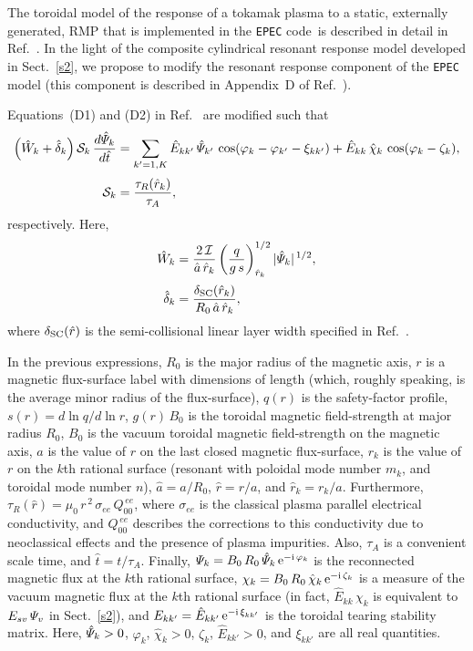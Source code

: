 \documentclass[12pt,prb,aps]{revtex4-1}
\begin{document}
The toroidal model of the response of a tokamak plasma to a static, externally generated, RMP that is implemented in the {\tt EPEC} code\,\cite{rftor1} is described in
detail in Ref.~. In the light of the composite cylindrical resonant response model developed in Sect.~\ref{s2}, we propose to 
modify the resonant  response component of the {\tt EPEC} model (this component is described in Appendix~D of Ref.~).

Equations~(D1) and (D2) in Ref.~ are modified such that 
\begin{align}\label{e15}
\left(\hat{W}_k + \hat{\delta}_k\right){\cal S}_k\,\frac{d\hat{\mit\Psi}_k}{d\hat{t}} &= \sum_{k'=1,K}\hat{E}_{kk'}\,\hat{\mit\Psi}_{k'}\,\cos(\varphi_k-\varphi_{k'}-\xi_{kk'})
+\hat{E}_{kk}\,\hat{\chi}_k\,\cos(\varphi_k-\zeta_k),\\[0.5ex]
{\cal S}_k&=\frac{\tau_R(\hat{r}_k)}{\tau_A},
\end{align}
respectively. Here, 
\begin{align}
\hat{W}_k &=\frac{2\,{\cal I}}{\hat{a}\,\hat{r}_k}\left(\frac{q}{g\,s}\right)_{\hat{r}_k}^{1/2} |\hat{\mit\Psi}_k|^{\,1/2},\\[0.5ex]
\hat{\delta}_k &= \frac{\delta_{\rm SC}(\hat{r}_k)}{R_0\,\hat{a}\,\hat{r}_k},
\end{align}
where $\delta_{\rm SC}(\hat{r})$ is the semi-collisional linear layer width specified in Ref.~.

In the previous expressions, $R_0$ is the major radius of the magnetic axis, $r$ is a magnetic flux-surface label with dimensions of length (which, roughly speaking, is the average minor radius of the
flux-surface), $q(r)$ is the safety-factor profile, $s(r)=d\ln q/d\ln r$, 
$g(r)\,B_0$ is the toroidal magnetic field-strength at major radius $R_0$, $B_0$ is the vacuum
toroidal magnetic field-strength on the magnetic axis, $a$ is the value of $r$ on the last closed magnetic flux-surface, $r_k$ is the value of $r$ on the $k$th rational
surface (resonant with poloidal mode number $m_k$, and toroidal mode number $n$), $\hat{a}=a/R_0$, $\hat{r}=r/a$, and $\hat{r}_k=r_k/a$. 
Furthermore, $\tau_R(\hat{r})= \mu_0\,r^{\,2}\,\sigma_{ee}\,Q_{00}^{\,ee}$, where $\sigma_{ee}$ is the classical plasma parallel electrical conductivity, and
$Q_{00}^{\,ee}$ describes the corrections to this conductivity due to neoclassical effects and the presence of plasma impurities. Also, $\tau_A$ is a convenient
scale time, and $\hat{t}=t/\tau_A$. Finally, ${\mit\Psi}_k = B_0\,R_0\,\hat{\mit\Psi}_k\,{\rm e}^{-{\rm i}\,\varphi_k}$ is the reconnected magnetic flux
at the $k$th rational surface, ${\mit\chi}_k = B_0\,R_0\,\hat{\mit\chi}_k\,{\rm e}^{-{\rm i}\,\zeta_k}$ is a measure of the vacuum magnetic flux at the $k$th
rational surface (in fact, $\hat{E}_{kk}\,\chi_k$ is equivalent to $E_{sv}\,{\mit\Psi}_v$ in Sect.~\ref{s2}), and $E_{kk'} =\hat{E}_{kk'}\,{\rm e}^{-{\rm i}\,\xi_{kk'}}$ is the toroidal tearing stability matrix.\cite{am1} Here, $\hat{\mit\Psi}_k>0$, $\varphi_k$, $\hat{\chi}_k>0$,
$\zeta_k$, $\hat{E}_{kk'}>0$, and $\xi_{kk'}$ are all real quantities.
\end{document}
